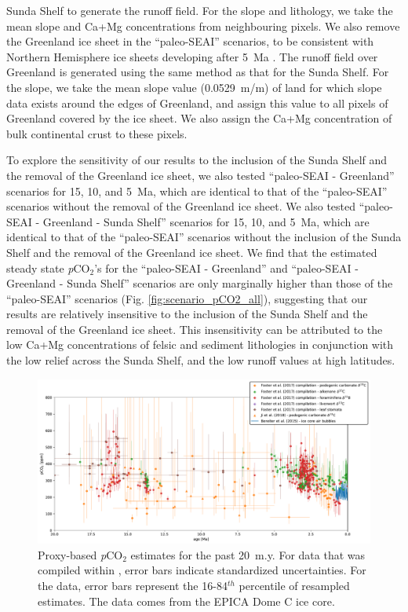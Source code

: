 \documentclass[11pt,letterpaper]{article}
\newcommand{\pCOtwo}{\textit{p}CO$_{2}$\xspace}
\begin{document}
Sunda Shelf to generate the runoff field. For the slope and lithology, we take the mean slope and Ca+Mg concentrations from neighbouring pixels. We also remove the Greenland ice sheet in the ``paleo-SEAI'' scenarios, to be consistent with Northern Hemisphere ice sheets developing after 5~Ma \citep{Haug2005a}. The runoff field over Greenland is generated using the same method as that for the Sunda Shelf. For the slope, we take the mean slope value (0.0529~m/m) of land for which slope data exists around the edges of Greenland, and assign this value to all pixels of Greenland covered by the ice sheet. We also assign the Ca+Mg concentration of bulk continental crust to these pixels.

To explore the sensitivity of our results to the inclusion of the Sunda Shelf and the removal of the Greenland ice sheet, we also tested ``paleo-SEAI - Greenland'' scenarios for 15, 10, and 5~Ma, which are identical to that of the ``paleo-SEAI'' scenarios without the removal of the Greenland ice sheet. We also tested ``paleo-SEAI - Greenland - Sunda Shelf'' scenarios for 15, 10, and 5~Ma, which are identical to that of the ``paleo-SEAI'' scenarios without the inclusion of the Sunda Shelf and the removal of the Greenland ice sheet. We find that the estimated steady state \pCOtwo's for the ``paleo-SEAI - Greenland'' and ``paleo-SEAI - Greenland - Sunda Shelf'' scenarios are only marginally higher than those of the ``paleo-SEAI'' scenarios (Fig. \ref{fig:scenario_pCO2_all}), suggesting that our results are relatively insensitive to the inclusion of the Sunda Shelf and the removal of the Greenland ice sheet. This insensitivity can be attributed to the low Ca+Mg concentrations of felsic and sediment lithologies in conjunction with the low relief across the Sunda Shelf, and the low runoff values at high latitudes.

\begin{figure}[h!]
    \centering
    \includegraphics[width=1\textwidth]{Figures/pCO2_proxies.pdf}
    \caption{Proxy-based \pCOtwo estimates for the past 20~m.y. For data that was compiled within \citet{Foster2017a}, error bars indicate standardized uncertainties. For the \citet{Ji2018a} data, error bars represent the 16-84$^{th}$ percentile of resampled estimates. The \citet{Bereiter2015a} data comes from the EPICA Dome C ice core.}
    \label{fig:pCO2_proxies}
\end{figure}
\end{document}
